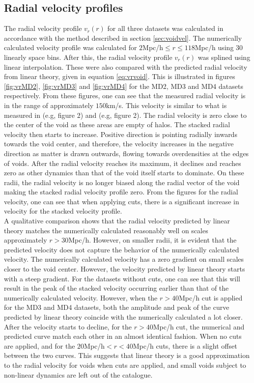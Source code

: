 \subsection{Radial velocity profiles}
The radial velocity profile $v_r(r)$ for all three datasets was calculated in accordance with the method described in section \ref{sec:voidvel}. The numerically calculated velocity profile was calculated for $2$Mpc/h$\leq r\leq 118$Mpc/h using $30$ linearly space bins. After this, the radial velocity profile $v_r(r)$ was splined using linear interpolation. These were also compared with the predicted radial velocity from linear theory, given in equation \ref{eq:vrvoid}. This is illustrated in figures \ref{fig:vrMD2}, \ref{fig:vrMD3} and \ref{fig:vrMD4} for the MD2, MD3 and MD4 datasets respectively. From these figures, one can see that the measured radial velocity is in the range of approximately $150$km/s. This velocity is similar to what is measured in \cite{Nadathur_2018} (e.g, figure 2) and \cite{Achitouv_streaming} (e.g, figure 2). The radial velocity is zero close to the center of the void as these areas are empty of halos. The stacked radial velocity then starts to increase. Positive direction is pointing radially inwards towards the void center, and therefore, the velocity increases in the negative direction as matter is drawn outwards, flowing towards overdensities at the edges of voids. After the radial velocity reaches its maximum, it declines and reaches zero as other dynamics than that of the void itself starts to dominate. On these radii, the radial velocity is no longer biased along the radial vector of the void making the stacked radial velocity profile zero. From the figures for the radial velocity, one can see that when applying cuts, there is a significant increase in velocity for the stacked velocity profile. \\\indent
A qualitative comparison shows that the radial velocity predicted by linear theory matches the numerically calculated reasonably well on scales approximately $r>30$Mpc/h. However, on smaller radii, it is evident that the predicted velocity does not capture the behavior of the numerically calculated velocity. The numerically calculated velocity has a zero gradient on small scales closer to the void center. However, the velocity predicted by linear theory starts with a steep gradient. For the datasets without cuts, one can see that this will result in the peak of the stacked velocity occurring earlier than that of the numerically calculated velocity. However, when the $r>40$Mpc/h cut is applied for the MD3 and MD4 datasets, both the amplitude and peak of the curve predicted by linear theory coincide with the numerically calculated a lot closer. After the velocity starts to decline, for the $r>40$Mpc/h cut, the numerical and predicted curve match each other in an almost identical fashion. When no cuts are applied, and for the $20$Mpc/h$<r<40$Mpc/h cuts, there is a slight offset between the two curves. This suggests that linear theory is a good approximation to the radial velocity for voids when cuts are applied, and small voids subject to non-linear dynamics are left out of the catalogue.\\\indent

